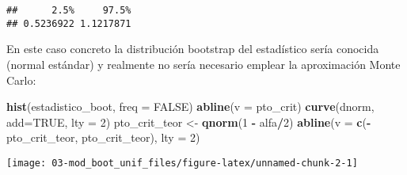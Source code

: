 \documentclass[
]{book}
\newenvironment{Shaded}{\begin{snugshade}}{\end{snugshade}}
\newcommand{\CommentTok}[1]{\textcolor[rgb]{0.56,0.35,0.01}{\textit{#1}}}
\newcommand{\DataTypeTok}[1]{\textcolor[rgb]{0.13,0.29,0.53}{#1}}
\newcommand{\DecValTok}[1]{\textcolor[rgb]{0.00,0.00,0.81}{#1}}
\newcommand{\KeywordTok}[1]{\textcolor[rgb]{0.13,0.29,0.53}{\textbf{#1}}}
\newcommand{\NormalTok}[1]{#1}
\newcommand{\OperatorTok}[1]{\textcolor[rgb]{0.81,0.36,0.00}{\textbf{#1}}}
\newcommand{\OtherTok}[1]{\textcolor[rgb]{0.56,0.35,0.01}{#1}}
\newcommand{\StringTok}[1]{\textcolor[rgb]{0.31,0.60,0.02}{#1}}
\theoremstyle{break}
\theoremstyle{definition}
\theoremstyle{definition}
\theoremstyle{definition}
\theoremstyle{remark}
\begin{document}
\begin{Shaded}
\end{Shaded}

\begin{verbatim}
##      2.5%     97.5% 
## 0.5236922 1.1217871
\end{verbatim}

En este caso concreto la distribución bootstrap del estadístico sería conocida (normal estándar) y realmente no sería necesario emplear la aproximación Monte Carlo:

\begin{Shaded}
\begin{Highlighting}[]
\KeywordTok{hist}\NormalTok{(estadistico_boot, }\DataTypeTok{freq =} \OtherTok{FALSE}\NormalTok{)}
\KeywordTok{abline}\NormalTok{(}\DataTypeTok{v =}\NormalTok{ pto_crit)}
\KeywordTok{curve}\NormalTok{(dnorm, }\DataTypeTok{add=}\OtherTok{TRUE}\NormalTok{, }\DataTypeTok{lty =} \DecValTok{2}\NormalTok{)}
\NormalTok{pto_crit_teor <-}\StringTok{ }\KeywordTok{qnorm}\NormalTok{(}\DecValTok{1} \OperatorTok{-}\StringTok{ }\NormalTok{alfa}\OperatorTok{/}\DecValTok{2}\NormalTok{)}
\KeywordTok{abline}\NormalTok{(}\DataTypeTok{v =} \KeywordTok{c}\NormalTok{(}\OperatorTok{-}\NormalTok{pto_crit_teor, pto_crit_teor), }\DataTypeTok{lty =} \DecValTok{2}\NormalTok{)}
\end{Highlighting}
\end{Shaded}

\begin{center}\texttt{[image: 03-mod\_boot\_unif\_files/figure-latex/unnamed-chunk-2-1]} \end{center}
\end{document}
